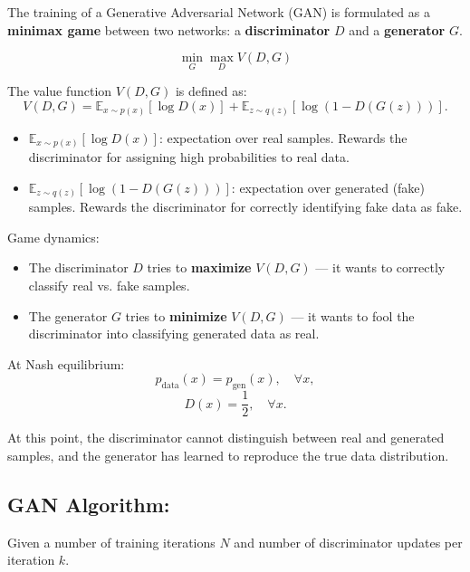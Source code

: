 \documentclass[11pt]{article}
\begin{document}
The training of a Generative Adversarial Network (GAN) is formulated as a \textbf{minimax game} between two networks:
a \textbf{discriminator} $D$ and a \textbf{generator} $G$.

\[
	\min_G \max_D V(D, G)
\]

The value function $V(D, G)$ is defined as:
\[
	V(D, G) =
	\mathbb{E}_{x \sim p(x)} [\log D(x)] +
	\mathbb{E}_{z \sim q(z)} [\log(1 - D(G(z)))].
\]

\begin{itemize}
	\item $\mathbb{E}_{x \sim p(x)}[\log D(x)]$: expectation over real samples.
	      Rewards the discriminator for assigning high probabilities to real data.
	\item $\mathbb{E}_{z \sim q(z)}[\log(1 - D(G(z)))]$: expectation over generated (fake) samples.
	      Rewards the discriminator for correctly identifying fake data as fake.
\end{itemize}

\pagebreak

Game dynamics:
\begin{itemize}
	\item The discriminator $D$ tries to \textbf{maximize} $V(D, G)$ — it wants to correctly classify real vs. fake samples.
	\item The generator $G$ tries to \textbf{minimize} $V(D, G)$ — it wants to fool the discriminator into classifying generated data as real.
\end{itemize}

At Nash equilibrium:
\[
	p_{\text{data}}(x) = p_{\text{gen}}(x), \quad \forall x,
\]
\[
	D(x) = \frac{1}{2}, \quad \forall x.
\]

At this point, the discriminator cannot distinguish between real and generated samples,
and the generator has learned to reproduce the true data distribution.

\subsection*{GAN Algorithm:}
Given a number of training iterations $N$ and number of discriminator updates per iteration $k$.
\end{document}
